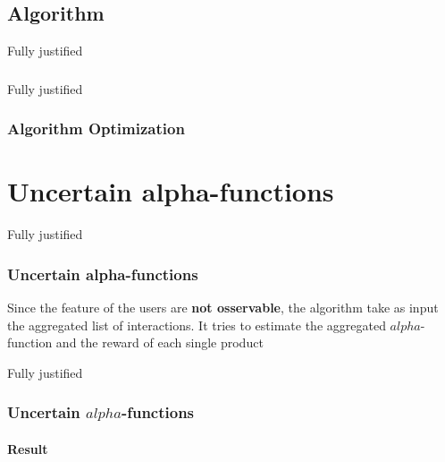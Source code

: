 \documentclass{beamer}
\begin{document}

\subsection{Algorithm}


\begin {frame} {Fully justified}

\frametitle{}
\framesubtitle{}

\end {frame}


\begin {frame} {Fully justified}

\frametitle{Algorithm Optimization}
\framesubtitle{}

\end {frame}




\AtBeginSection[]
{
\begin{frame}{}
    \tableofcontents[currentsection]
\end{frame}
}


\section{Uncertain alpha-functions}

\begin {frame}{Fully justified}

\frametitle{Uncertain alpha-functions}
Since the feature of the users are \textbf{not osservable}, the algorithm take as input the aggregated list of interactions.
It tries to estimate the aggregated $alpha$-function and the reward of each single product

\end{frame}


\begin {frame}{Fully justified}

\frametitle{Uncertain $alpha$-functions}
\framesubtitle{Result}

\end{frame}
\end{document}
